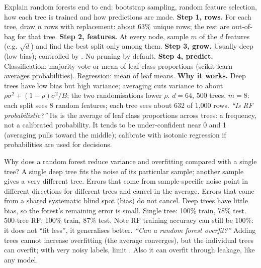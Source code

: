 \begin{qa}{ Explain random forests end to end: bootstrap sampling, random feature
selection, how each tree is trained and how predictions are made.}
\why
\textbf{Step 1, rows.} For each tree, draw $n$ rows with replacement: about 63\% unique rows; the rest are out-of-bag for that tree.
\textbf{Step 2, features.} At every node, sample $m$ of the $d$ features (e.g. $\sqrt d$) and find the best split only among them.
\textbf{Step 3, grow.} Usually deep (low bias); controlled by . No pruning by default.
\textbf{Step 4, predict.} Classification: majority vote or mean of leaf class proportions (scikit-learn averages probabilities).
Regression: mean of leaf means.
\textbf{Why it works.} Deep trees have low bias but high variance; averaging cuts variance to about $\rho\sigma^2 + (1-\rho)\sigma^2/B$;
the two randomisations lower $\rho$.
\worked $d = 64$, 500 trees, $m = 8$: each split sees 8 random features; each tree sees about 632 of 1{,}000 rows.
\pushes \emph{``Is RF probabilistic?''} Its  is the average of leaf class proportions across trees: a
frequency, not a calibrated probability. It tends to be under-confident near 0 and 1 (averaging pulls toward the middle); calibrate
with isotonic regression if probabilities are used for decisions.
\end{qa}

\begin{qa}{ Why does a random forest reduce variance and overfitting compared with a single tree?}
\why A single deep tree fits the noise of its particular sample; another sample gives a very different tree. Errors that come from
sample-specific noise point in different directions for different trees and cancel in the average. Errors that come from a shared
systematic blind spot (bias) do not cancel. Deep trees have little bias, so the forest's remaining error is small.
\worked Single tree: 100\% train, 78\% test. 500-tree RF: 100\% train, 87\% test. Note RF training accuracy can still be 100\%:
it does not ``fit less'', it generalises better.
\pushes \emph{``Can a random forest overfit?''} Adding trees cannot increase overfitting (the average converges), but the
individual trees can overfit; with very noisy labels, limit . Also it can overfit through leakage, like any
model.
\end{qa}

